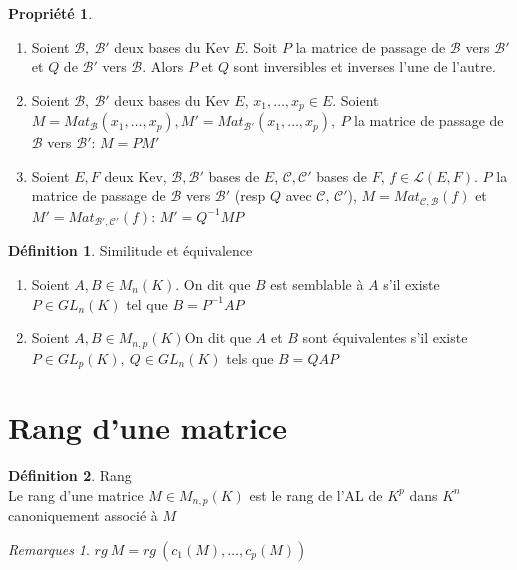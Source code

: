 \documentclass[fleqn]{article}
\theoremstyle{definition} \newtheorem*{defi}{D\'efinition}
\theoremstyle{definition} \newtheorem*{theo}{Th\'eor\`eme}
\theoremstyle{definition} \newtheorem*{coro}{Corollaire}
\theoremstyle{definition} \newtheorem*{nota}{Notation}
\theoremstyle{definition} \newtheorem*{vocab}{Vocabulaire}
\theoremstyle{remark} \newtheorem*{rqs}{Remarques}
\theoremstyle{definition} \newtheorem*{prop}{Propri\'et\'e}
\begin{document}
\begin{prop} $ $
	\begin{enumerate}
		\item Soient $\mathscr{B},\ \mathscr{B}'$ deux bases du Kev $E$. Soit $P$ la matrice de passage
		de $\mathscr{B}$ vers $\mathscr{B}'$ et $Q$ de $\mathscr{B}'$ vers $\mathscr{B}$. Alors $P$ et $Q$ sont inversibles et inverses l'une de
		l'autre.
		\item Soient $\mathscr{B},\ \mathscr{B}'$ deux bases du Kev $E$, $x_1, \hdots, x_p \in E$. Soient $M = Mat_\mathscr{B}(x_1, \hdots, x_p),
		M' = Mat_{\mathscr{B}'}(x_1, \hdots, x_p),\ P$ la matrice de passage de $\mathscr{B}$ vers $\mathscr{B}'$: $M = PM'$
		\item Soient $E,F$ deux Kev, $\mathscr{B}, \mathscr{B}'$ bases de $E$, $\mathscr{C}, \mathscr{C}'$ bases de $F$, $f \in \mathscr{L}(E,F)$.
		$P$ la matrice de passage de $\mathscr{B}$ vers $\mathscr{B}'$ (resp $Q$ avec $\mathscr{C}$, $\mathscr{C}'$), $M =
		Mat_{\mathscr{C}, \mathscr{B}}(f)$ et $M' = Mat_{\mathscr{B}', \mathscr{C}'}(f)$: $M' = Q^{-1}MP$
	\end{enumerate}
\end{prop}

\begin{defi} Similitude et \'equivalence
	\begin{enumerate}
		\item Soient $A,B \in M_n(K)$. On dit que $B$ est semblable \`a $A$ s'il existe $P \in GL_n(K)$ tel que $B=P^{-1}AP$
		\item Soient $A,B \in M_{n,p}(K)$On dit que $A$ et $B$ sont \'equivalentes s'il existe $P \in GL_p(K),\ Q \in GL_n(K)$ tels que $B = QAP$
	\end{enumerate}
\end{defi}

\section{Rang d'une matrice}
\begin{defi} Rang \\
	Le rang d'une matrice $M \in M_{n,p}(K)$ est le rang de l'AL de $K^p$ dans $K^n$ canoniquement associ\'e \`a $M$
\begin{rqs}
	$rg\ M = rg\ (c_1(M), \hdots, c_p(M))$
\end{rqs}
\end{defi}
\end{document}
